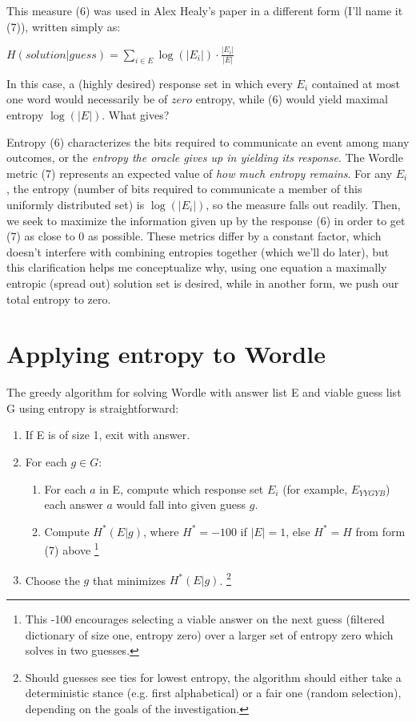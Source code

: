 \documentclass[11pt, oneside]{article} 	%
\begin{document}
This measure (6) was used in Alex Healy's paper \cite{1} in a different form (I'll name it (7)), written simply as:
\begin{center}
$H(solution | guess) = \sum_{i \in E}\log(|E_i|) \cdot \frac{|E_i|}{|E|}$ 
\end{center}

In this case, a (highly desired) response set in which every $E_i$ contained at most one word would necessarily be of $zero$ entropy, while (6) would yield maximal entropy $\log(|E|)$. What gives?

Entropy (6) characterizes the bits required to communicate an event among many outcomes, or the \emph{entropy the oracle gives up in yielding its response}. The Wordle metric (7) represents an expected value of \emph{how much entropy remains}. For any $E_i$, the entropy (number of bits required to communicate a member of this uniformly distributed set) is $\log(|E_i|)$, so the measure falls out readily. Then, we seek to maximize the information given up by the response (6) in order to get (7) as close to 0 as possible. These metrics differ by a constant factor, which doesn't interfere with combining entropies together (which we'll do later), but this clarification helps me conceptualize why, using one equation a maximally entropic (spread out) solution set is desired, while in another form, we push our total entropy to zero.

\section{Applying entropy to Wordle}

The greedy algorithm for solving Wordle with answer list E and viable guess list G using entropy is straightforward:
\begin{enumerate}
\item If E is of size 1, exit with answer.
\item For each $g \in G$: 
 \begin{enumerate}
 \item For each $a$ in E, compute which response set $E_i$ (for example, $E_{YYGYB}$) each answer $a$ would fall into given guess $g$.
 \item Compute $H^*(E | g)$, where $H^* = -100$ if $|E| = 1$, else $H^* = H$ from form (7) above \footnote{This -100 encourages selecting a viable answer on the next guess (filtered dictionary of size one, entropy zero) over a larger set of entropy zero which solves in two guesses.}
 \end{enumerate}
\item Choose the $g$ that minimizes $H^*(E | g)$. \footnote{Should guesses see ties for lowest entropy, the algorithm should either take a deterministic stance (e.g. first alphabetical) or a fair one (random selection), depending on the goals of the investigation.}
\end{enumerate}
\end{document}
